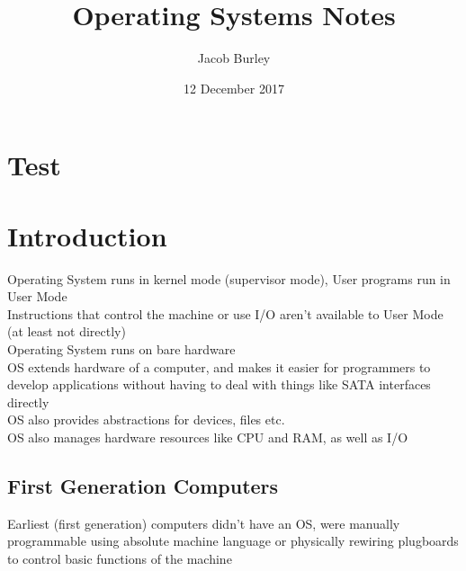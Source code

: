 \documentclass{article}
\title{Operating Systems Notes}
\author{Jacob Burley} %
\date{12 December 2017}
\begin{document}

\maketitle
\section*{Test}

\section{Introduction}
Operating System runs in kernel mode (supervisor mode), User programs run in User Mode
\\Instructions that control the machine or use I/O aren't available to User Mode (at least not directly)
\\Operating System runs on bare hardware
\\OS extends hardware of a computer, and makes it easier for programmers to develop applications without having to deal with things like SATA interfaces directly
\\OS also provides abstractions for devices, files etc.
\\OS also manages hardware resources like CPU and RAM, as well as I/O
\subsection*{First Generation Computers}
Earliest (first generation) computers didn't have an OS, were manually programmable using absolute machine language or physically rewiring plugboards to control basic functions of the machine
\end{document}
